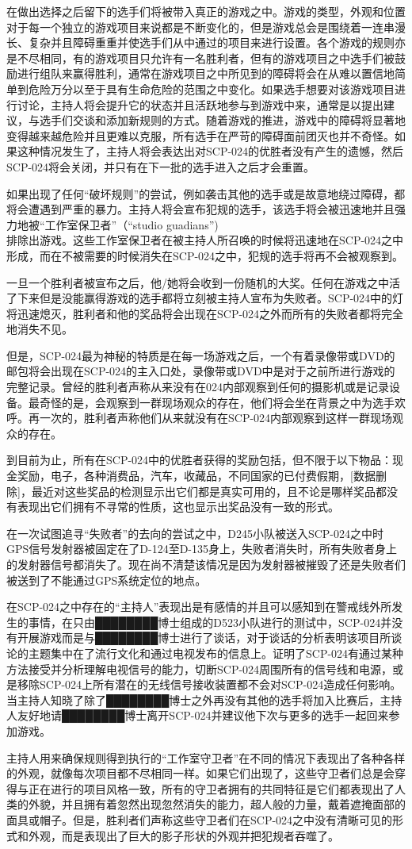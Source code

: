 在做出选择之后留下的选手们将被带入真正的游戏之中。游戏的类型，外观和位置对于每一个独立的游戏项目来说都是不断变化的，但是游戏总会是围绕着一连串漫长、复杂并且障碍重重并使选手们从中通过的项目来进行设置。各个游戏的规则亦是不尽相同，有的游戏项目只允许有一名胜利者，但有的游戏项目之中选手们被鼓励进行组队来赢得胜利，通常在游戏项目之中所见到的障碍将会在从难以置信地简单到危险万分以至于具有生命危险的范围之中变化。如果选手想要对该游戏项目进行讨论，主持人将会提升它的状态并且活跃地参与到游戏中来，通常是以提出建议，与选手们交谈和添加新规则的方式。随着游戏的推进，游戏中的障碍将显著地变得越来越危险并且更难以克服，所有选手在严苛的障碍面前团灭也并不奇怪。如果这种情况发生了，主持人将会表达出对SCP-024的优胜者没有产生的遗憾，然后SCP-024将会关闭，并只有在下一批的选手进入之后才会重置。

如果出现了任何“破坏规则”的尝试，例如袭击其他的选手或是故意地绕过障碍，都将会遭遇到严重的暴力。主持人将会宣布犯规的选手，该选手将会被迅速地并且强力地被“工作室保卫者”（“studio guadians”)\\
排除出游戏。这些工作室保卫者在被主持人所召唤的时候将迅速地在SCP-024之中形成，而在不被需要的时候消失在SCP-024之中，犯规的选手将再不会被观察到。

一旦一个胜利者被宣布之后，他\slash 她将会收到一份随机的大奖。任何在游戏之中活了下来但是没能赢得游戏的选手都将立刻被主持人宣布为失败者。SCP-024中的灯将迅速熄灭，胜利者和他的奖品将会出现在SCP-024之外而所有的失败者都将完全地消失不见。

但是，SCP-024最为神秘的特质是在每一场游戏之后，一个有着录像带或DVD的邮包将会出现在SCP-024的主入口处，录像带或DVD中是对于之前所进行游戏的完整记录。曾经的胜利者声称从来没有在024内部观察到任何的摄影机或是记录设备。最奇怪的是，会观察到一群现场观众的存在，他们将会坐在背景之中为选手欢呼。再一次的，胜利者声称他们从来就没有在SCP-024内部观察到这样一群现场观众的存在。

到目前为止，所有在SCP-024中的优胜者获得的奖励包括，但不限于以下物品：现金奖励，电子，各种消费品，汽车，收藏品，不同国家的已付费假期，[数据删除]，最近对这些奖品的检测显示出它们都是真实可用的，且不论是哪样奖品都没有表现出它们拥有不寻常的性质，这也显示出奖品没有一致的形式。

在一次试图追寻“失败者”的去向的尝试之中，D245小队被送入SCP-024之中时GPS信号发射器被固定在了D-124至D-135身上，失败者消失时，所有失败者身上的发射器信号都消失了。现在尚不清楚该情况是因为发射器被摧毁了还是失败者们被送到了不能通过GPS系统定位的地点。

在SCP-024之中存在的“主持人”表现出是有感情的并且可以感知到在警戒线外所发生的事情，在只由████████博士组成的D523小队进行的测试中，SCP-024并没有开展游戏而是与████████博士进行了谈话，对于谈话的分析表明该项目所谈论的主题集中在了流行文化和通过电视发布的信息上。证明了SCP-024有通过某种方法接受并分析理解电视信号的能力，切断SCP-024周围所有的信号线和电源，或是移除SCP-024上所有潜在的无线信号接收装置都不会对SCP-024造成任何影响。当主持人知晓了除了████████博士之外再没有其他的选手将加入比赛后，主持人友好地请████████博士离开SCP-024并建议他下次与更多的选手一起回来参加游戏。

主持人用来确保规则得到执行的“工作室守卫者”在不同的情况下表现出了各种各样的外观，就像每次项目都不尽相同一样。如果它们出现了，这些守卫者们总是会穿得与正在进行的项目风格一致，所有的守卫者拥有的共同特征是它们都表现出了人类的外貌，并且拥有着忽然出现忽然消失的能力，超人般的力量，戴着遮掩面部的面具或帽子。但是，胜利者们声称这些守卫者们在SCP-024之中没有清晰可见的形式和外观，而是表现出了巨大的影子形状的外观并把犯规者吞噬了。
